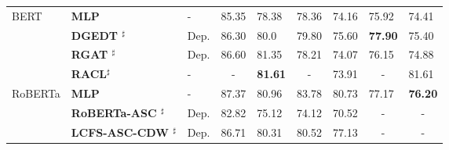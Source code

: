\documentclass[11pt]{article}
\begin{document}
\begin{table*}[!ht]
\begin{tabular}{m{3cm}m{3.3cm}m{2.5cm}m{1.15cm}<{\centering}m{1.15cm}<{\centering}m{1.15cm}<{\centering}m{1.15cm}<{\centering}m{1.15cm}<{\centering}m{1.15cm}<{\centering}}
    \midrule
    \multirow{4}{*}{BERT}             & \textbf{MLP          }                    & -                               & 85.35                             & 78.38                              & 78.36                             & 74.16                              & 75.92                             & 74.41                              \\
                                      & \textbf{DGEDT $^\sharp$         }         & Dep.                            & 86.30                             & 80.0                               & 79.80                             & 75.60                              & \textbf{77.90}                    & 75.40                              \\
                                      & \textbf{RGAT  $^\sharp$       }           & Dep.                            & 86.60                             & 81.35                              & 78.21                             & 74.07                              & 76.15                             & 74.88                              \\
                                      & \textbf{RACL$^\sharp$         }           & -                               & \multicolumn{1}{c}{-}             & \textbf{81.61}                     & \multicolumn{1}{c}{-}             & 73.91                              & \multicolumn{1}{c}{-}             & 81.61                              \\
    \midrule
    \multirow{9}{*}{RoBERTa}          & \textbf{MLP          }                    & -                               & 87.37                             & 80.96                              & 83.78                             & 80.73                              & 77.17                             & \textbf{76.20}                     \\
                                      & \textbf{RoBERTa-ASC $^\sharp$ }           & Dep.                            & 82.82                             & 75.12                              & 74.12                             & 70.52                              & \multicolumn{1}{c}{-}             & \multicolumn{1}{c}{-}              \\
                                      & \textbf{LCFS-ASC-CDW $^\sharp$}           & Dep.                            & 86.71                             & 80.31                              & 80.52                             & 77.13                              & \multicolumn{1}{c}{-}             & \multicolumn{1}{c}{-}              \\

\end{tabular}
\end{table*}
\end{document}
